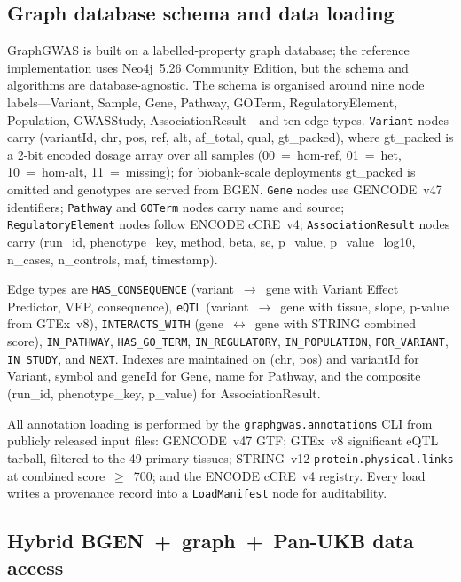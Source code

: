 \subsection*{Graph database schema and data loading}\label{methods:schema}

GraphGWAS is built on a labelled-property graph
database\cite{robinson2015graph}; the reference implementation
uses Neo4j~5.26 Community Edition, but the schema and algorithms
are database-agnostic. The schema is
organised around nine node labels---Variant, Sample, Gene, Pathway,
GOTerm, RegulatoryElement, Population, GWASStudy,
AssociationResult---and ten edge types. \texttt{Variant} nodes carry
(variantId, chr, pos, ref, alt, af\_total, qual, gt\_packed), where
gt\_packed is a 2-bit encoded dosage array over all samples
(00~=~hom-ref, 01~=~het, 10~=~hom-alt, 11~=~missing); for
biobank-scale deployments gt\_packed is omitted and genotypes are
served from BGEN\cite{band2018bgen}. \texttt{Gene} nodes use GENCODE~v47 identifiers;
\texttt{Pathway} and \texttt{GOTerm} nodes carry name and source;
\texttt{RegulatoryElement} nodes follow ENCODE cCRE~v4;
\texttt{AssociationResult} nodes carry (run\_id, phenotype\_key,
method, beta, se, p\_value, p\_value\_log10, n\_cases, n\_controls,
maf, timestamp).

Edge types are \texttt{HAS\_CONSEQUENCE} (variant~$\rightarrow$~gene
with Variant Effect Predictor, VEP\cite{mclaren2016ensembl},
consequence), \texttt{eQTL} (variant~$\rightarrow$~gene with tissue,
slope, p-value from GTEx~v8\cite{gtex2020}), \texttt{INTERACTS\_WITH}
(gene~$\leftrightarrow$~gene with STRING combined score),
\texttt{IN\_PATHWAY}, \texttt{HAS\_GO\_TERM}, \texttt{IN\_REGULATORY},
\texttt{IN\_POPULATION}, \texttt{FOR\_VARIANT},
\texttt{IN\_STUDY}, and \texttt{NEXT}. Indexes are maintained on
(chr, pos) and variantId for Variant, symbol and geneId for Gene,
name for Pathway, and the composite (run\_id, phenotype\_key,
p\_value) for AssociationResult.

All annotation loading is performed by the
\texttt{graphgwas.annotations} CLI from publicly released input
files: GENCODE~v47 GTF\cite{frankish2023gencode}; GTEx~v8
significant eQTL tarball\cite{gtex2020}, filtered to the 49 primary
tissues; STRING~v12 \texttt{protein.physical.links} at combined
score~$\geq$~700\cite{szklarczyk2023string}; and the ENCODE cCRE~v4
registry\cite{encode2020expanded}. Every
load writes a provenance record into a \texttt{LoadManifest} node
for auditability.

\subsection*{Hybrid BGEN~+~graph~+~Pan-UKB data access}\label{methods:panukb}

